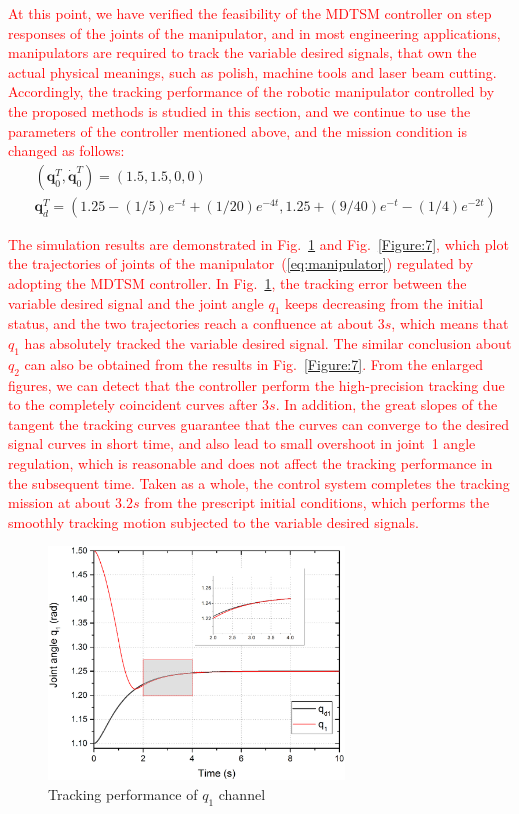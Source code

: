 \documentclass[3p]{elsarticle}
\theoremstyle{plain}
\theoremstyle{remark}
\begin{document}
\textcolor{red}{At this point, we have verified the feasibility of the MDTSM controller on step responses of the joints of the manipulator, and in most engineering applications, manipulators are required to track the variable desired signals, that own the actual physical meanings, such as polish, machine tools and laser beam cutting. Accordingly, the tracking performance of the robotic manipulator controlled by the proposed methods is studied in this section, and we continue to use the parameters of the controller mentioned above, and the mission condition is changed as follows:}
\begin{align*}
&(\bm q_0^T, \dot{\bm q}_0^T)= (1.5,1.5,0,0)\\
&{\bm q}_d^T=(1.25-(1/5)e^{-t}+(1/20)e^{-4t},1.25+(9/40)e^{-t}-(1/4)e^{-2t})
\end{align*}\par
 \textcolor{red}{The simulation results are demonstrated in Fig.~\ref{Figure:6} and Fig.~\ref{Figure:7}, which plot the trajectories of joints of the manipulator~(\ref{eq:manipulator}) regulated by adopting the MDTSM controller. In Fig.~\ref{Figure:6}, the tracking error between the variable desired signal and the joint angle $q_1$ keeps decreasing from the initial status, and the two trajectories reach a confluence at about $3s$, which means that $q_1$ has absolutely tracked the variable desired signal. The similar conclusion about $q_2$ can also be obtained from the results in Fig.~\ref{Figure:7}. From the enlarged figures, we can detect that the controller perform the high-precision tracking due to the completely coincident curves after $3s$. In addition, the great slopes of the tangent the tracking curves guarantee that the curves can converge to the desired signal curves in short time, and also lead to small overshoot in joint~1 angle regulation, which is reasonable and does not affect the tracking performance in the subsequent time. Taken as a whole, the control system completes the tracking mission at about $3.2s$ from the prescript initial conditions, which performs the smoothly tracking motion subjected to the variable desired signals.}
\begin{figure}[http]
\centering
\includegraphics[width=0.7\textwidth]{paper3_fig6.eps}
\caption{Tracking performance of $q_1$ channel}
\label{Figure:6}
\end{figure}
\end{document}
